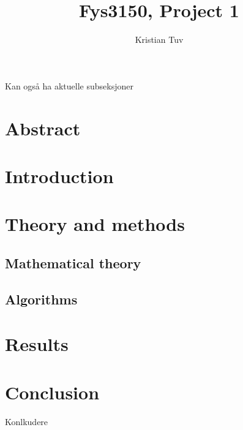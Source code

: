 \documentclass[a4paper, norsk, 12pt]{article}
\begin{document}
\author{Kristian Tuv}
\title{Fys3150, Project 1}
\maketitle
Kan også ha aktuelle subseksjoner
\section*{Abstract}


\section*{Introduction}
\section*{Theory and methods}
\subsection*{Mathematical theory}
\subsection*{Algorithms}



\section*{Results}

\section*{Conclusion}
Konlkudere
\end{document}
